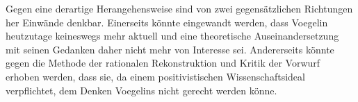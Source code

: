 
Gegen eine derartige Herangehensweise sind von zwei gegensätzlichen Richtungen
her Einwände denkbar. Einerseits könnte eingewandt werden, dass Voegelin
heutzutage keineswegs mehr aktuell und eine theoretische Auseinandersetzung
mit seinen Gedanken daher nicht mehr von Interesse sei. Andererseits könnte
gegen die Methode der rationalen Rekonstruktion und Kritik der Vorwurf erhoben
werden, dass sie, da einem positivistischen Wissenschaftsideal verpflichtet,
dem Denken Voegelins nicht gerecht werden könne.

